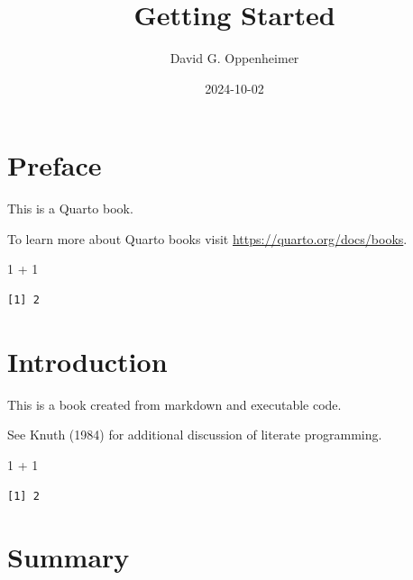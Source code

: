\documentclass[
  letterpaper,
  DIV=11,
  numbers=noendperiod]{scrreprt}
\title{Getting Started}
\author{David G. Oppenheimer}
\date{2024-10-02}
\newenvironment{Shaded}{\begin{snugshade}}{\end{snugshade}}
\newcommand{\DecValTok}[1]{\textcolor[rgb]{0.68,0.00,0.00}{#1}}
\newcommand{\SpecialCharTok}[1]{\textcolor[rgb]{0.37,0.37,0.37}{#1}}
\renewcommand*\contentsname{Table of contents}
\newcommand\contentsname{Table of contents}
\begin{document}
\maketitle

\renewcommand*\contentsname{Table of contents}
{
\hypersetup{linkcolor=}
\setcounter{tocdepth}{2}
\tableofcontents
}

\chapter*{Preface}\label{preface}


This is a Quarto book.

To learn more about Quarto books visit
\url{https://quarto.org/docs/books}.

\begin{Shaded}
\begin{Highlighting}[]
\DecValTok{1} \SpecialCharTok{+} \DecValTok{1}
\end{Highlighting}
\end{Shaded}

\begin{verbatim}
[1] 2
\end{verbatim}


\chapter{Introduction}\label{introduction}

This is a book created from markdown and executable code.

See Knuth (1984) for additional discussion of literate programming.

\begin{Shaded}
\begin{Highlighting}[]
\DecValTok{1} \SpecialCharTok{+} \DecValTok{1}
\end{Highlighting}
\end{Shaded}

\begin{verbatim}
[1] 2
\end{verbatim}


\chapter{Summary}\label{summary}
\end{document}
